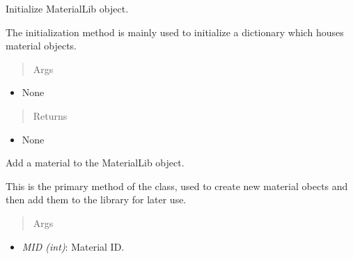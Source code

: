 \documentclass[letterpaper,10pt,english]{sphinxmanual}
\begin{document}
\begin{fulllineitems}
\begin{itemize}
\begin{description}
\end{description}

\end{itemize}

\begin{fulllineitems}
\label{structures:AeroComBAT.Structures.MaterialLib.__init__}
Initialize MaterialLib object.

The initialization method is mainly used to initialize a dictionary
which houses material objects.
\begin{quote}\begin{description}
\item[{Args}] \leavevmode
\end{description}\end{quote}
\begin{itemize}
\item {} 
None

\end{itemize}
\begin{quote}\begin{description}
\item[{Returns}] \leavevmode
\end{description}\end{quote}
\begin{itemize}
\item {} 
None

\end{itemize}

\end{fulllineitems}


\begin{fulllineitems}
\label{structures:AeroComBAT.Structures.MaterialLib.addMat}
Add a material to the MaterialLib object.

This is the primary method of the class, used to create new material
obects and then add them to the library for later use.
\begin{quote}\begin{description}
\item[{Args}] \leavevmode
\end{description}\end{quote}
\begin{itemize}
\item {} 
\emph{MID (int)}: Material ID.


\end{itemize}
\end{fulllineitems}
\end{fulllineitems}
\end{document}
